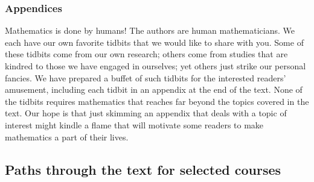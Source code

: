 \begin{itemize}
\bigskip

\noindent {}
\end{itemize}

\subsubsection{Appendices}

Mathematics is done by humans!  The authors are human mathematicians.  We each have our own favorite tidbits that we would like to share with you.  Some of these tidbits come from our own research; others come from studies that are kindred to those we have engaged in ourselves; yet others just strike our personal fancies.  We have prepared a buffet of such tidbits for the interested readers' amusement, including each tidbit in an appendix at the end of the text.  None of the tidbits requires mathematics that reaches far beyond the topics covered in the text.  Our hope is that just skimming an appendix that deals with a topic of interest might kindle a flame that will motivate some readers to make mathematics a part of their lives.


\subsection{Paths through the text for selected courses}

